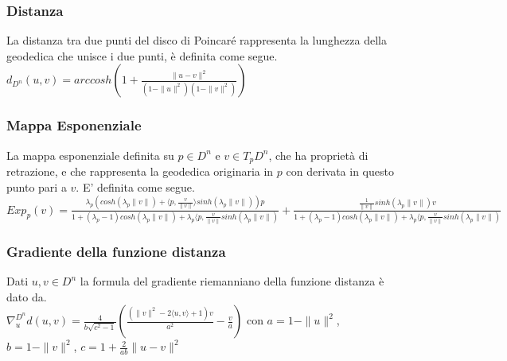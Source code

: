 \documentclass[a4paper, 12pt]{article}
\begin{document}
\subsubsection{Distanza}
La distanza tra due punti del disco di Poincaré rappresenta la lunghezza della geodedica che unisce i due punti, è definita come segue.\\
$d_{D^n}(u, v) = arccosh(1 + \frac{\parallel u - v\parallel^2}{(1-\parallel u \parallel^2)(1-\parallel v \parallel^2)})$
\subsubsection{Mappa Esponenziale}
La mappa esponenziale definita su $p \in D^n$ e $v \in T_pD^n$, che ha proprietà di retrazione, e che rappresenta la geodedica originaria in $p$ con derivata in questo punto pari a $v$. E' definita come segue.\\
$Exp_p(v) = \frac{\lambda_p (cosh(\lambda_p \parallel v \parallel) + \langle p,\frac{v}{\parallel v \parallel} \rangle sinh(\lambda_p \parallel v \parallel))p}{1 + (\lambda_p - 1) cosh(\lambda_p \parallel v \parallel) + \lambda_p \langle p, \frac{v}{\parallel v \parallel} sinh(\lambda_p \parallel v \parallel)} + \frac{\frac{1}{\parallel v \parallel} sinh(\lambda_p \parallel v \parallel) v}{1 + (\lambda_p - 1) cosh(\lambda_p \parallel v \parallel) + \lambda_p \langle p, \frac{v}{\parallel v \parallel} sinh(\lambda_p \parallel v \parallel)}$
\subsubsection{Gradiente della funzione distanza}
Dati $u,v \in D^n$ la formula del gradiente riemanniano della funzione distanza è dato da.\\
$\nabla_u^{D^n} d(u,v) = \frac{4}{b \sqrt{c^2 - 1}} (\frac{(\parallel v \parallel^2 - 2\langle u,v \rangle + 1)v}{a^2} - \frac{v}{a})$ con $a = 1 - \parallel u \parallel^2$, $b = 1 - \parallel v \parallel^2$, $c = 1 + \frac{2}{ab} \parallel u - v \parallel^2$
\end{document}
